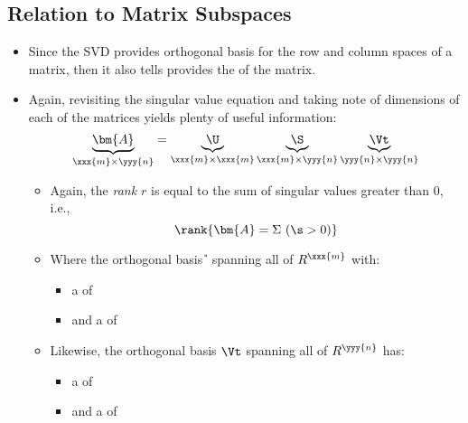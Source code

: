\begin{itemize}
  \subsection{Relation to Matrix Subspaces}\label{SVD Relation to Subspaces}
  \begin{itemize}
    \item Since the SVD provides orthogonal basis for the row and column spaces of a matrix, then it also tells provides the \hyperref[Null Space]{} of the matrix.
    \item Again, revisiting the singular value equation and taking note of dimensions of each of the matrices yields plenty of useful information:
    \[%
    \underbrace{\bm{A}}_{\xxx{m} \times \yyy{n}} = \underbrace{\U}_{\xxx{m} \times \xxx{m}} \underbrace{\S}_{\xxx{m} \times \yyy{n}} \underbrace{\Vt}_{\yyy{n} \times \yyy{n}}
    \]%
    \begin{itemize}
      \item Again, the \emph{rank \(r\)} is equal to the sum of singular values greater than 0, i.e.,
      \[%
      \rank{\bm{A}=\Sigma~(\s > 0)}
      \]%
      \item Where the orthogonal basis \U~spanning all of \(R^{\xxx{m}}\) with:
        \begin{itemize}
          \item a  of 
          \item and a  of 
        \end{itemize}
      \item Likewise, the orthogonal basis \(\Vt\) spanning all of \(R^\yyy{n}\) has:
      \begin{itemize}
        \item a  of 
        \item and a  of 
      \end{itemize}
    \end{itemize}
  \end{itemize}
\end{itemize}



